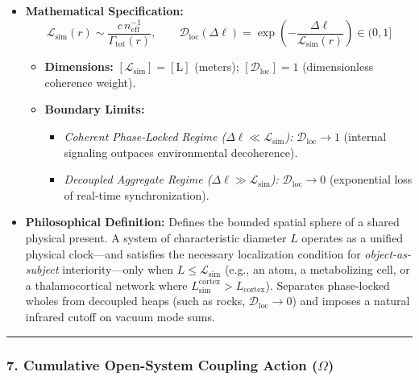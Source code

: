\documentclass[
]{article}
\providecommand{\tightlist}{%
  \setlength{\itemsep}{0pt}\setlength{\parskip}{0pt}}
\begin{document}
\begin{itemize}
\tightlist
\item
  \textbf{Mathematical Specification:}
  \[\mathcal{L}_{\mathrm{sim}}(r) \sim \frac{c \, n_{\mathrm{eff}}^{-1}}{\Gamma_{\mathrm{tot}}(r)}, \qquad \mathcal{D}_{\mathrm{loc}}(\Delta\ell) = \exp\!\left(-\frac{\Delta\ell}{\mathcal{L}_{\mathrm{sim}}(r)}\right) \in (0, 1]\]

  \begin{itemize}
  \tightlist
  \item
    \textbf{Dimensions:} \([\mathcal{L}_{\mathrm{sim}}] = [\text{L}]\)
    (meters); \([\mathcal{D}_{\mathrm{loc}}] = 1\) (dimensionless
    coherence weight).
  \item
    \textbf{Boundary Limits:}

    \begin{itemize}
    \tightlist
    \item
      \emph{Coherent Phase-Locked Regime
      (\(\Delta\ell \ll \mathcal{L}_{\mathrm{sim}}\)):}
      \(\mathcal{D}_{\mathrm{loc}} \to 1\) (internal signaling outpaces
      environmental decoherence).
    \item
      \emph{Decoupled Aggregate Regime
      (\(\Delta\ell \gg \mathcal{L}_{\mathrm{sim}}\)):}
      \(\mathcal{D}_{\mathrm{loc}} \to 0\) (exponential loss of
      real-time synchronization).
    \end{itemize}
  \end{itemize}
\item
  \textbf{Philosophical Definition:} Defines the bounded spatial sphere
  of a shared physical present. A system of characteristic diameter
  \(L\) operates as a unified physical clock---and satisfies the
  necessary localization condition for \emph{object-as-subject}
  interiority---only when \(L \le \mathcal{L}_{\mathrm{sim}}\) (e.g., an
  atom, a metabolizing cell, or a thalamocortical network where
  \(L_{\mathrm{sim}}^{\mathrm{cortex}} > L_{\mathrm{cortex}}\)).
  Separates phase-locked wholes from decoupled heaps (such as rocks,
  \(\mathcal{D}_{\mathrm{loc}} \to 0\)) and imposes a natural infrared
  cutoff on vacuum mode sums.
\end{itemize}

\begin{center}\rule{0.5\linewidth}{0.5pt}\end{center}

\subsubsection{\texorpdfstring{7. Cumulative Open-System Coupling Action
(\(\Omega\))}{7. Cumulative Open-System Coupling Action (\textbackslash Omega)}}\label{cumulative-open-system-coupling-action-omega}
\end{document}
